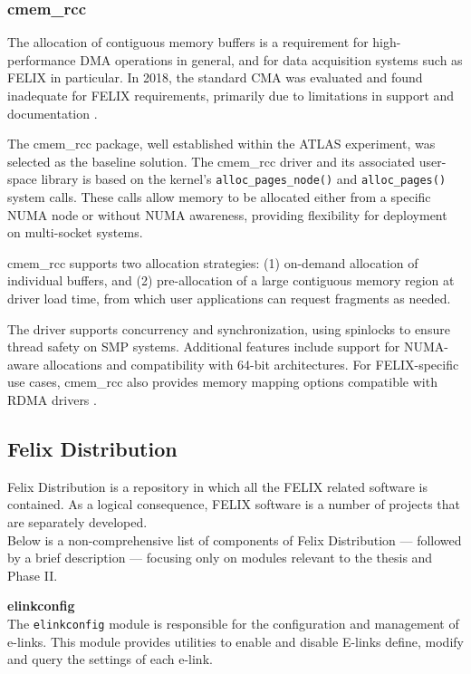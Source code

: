 \subsubsection{cmem\_rcc}

The allocation of contiguous memory buffers is a requirement for high-performance \acf{DMA} operations in general, and for data acquisition systems such as \acs{FELIX} in particular. In 2018, the standard \ac{CMA} was evaluated and found inadequate for \ac{FELIX} requirements, primarily due to limitations in support and documentation \cite{cmem-rcc}.

The cmem\_rcc \cite{cmem-rcc} package, well established within the \acs{ATLAS} experiment, was selected as the baseline solution. The cmem\_rcc driver and its associated user-space library is based on the kernel's \texttt{alloc\_pages\_node()} and \texttt{alloc\_pages()} system calls. These calls allow memory to be allocated either from a specific \ac{NUMA} node or without \ac{NUMA} awareness, providing flexibility for deployment on multi-socket systems.

cmem\_rcc supports two allocation strategies: (1) on-demand allocation of individual buffers, and (2) pre-allocation of a large contiguous memory region at driver load time, from which user applications can request fragments as needed.

The driver supports concurrency and synchronization, using spinlocks to ensure thread safety on \ac{SMP} systems. Additional features include support for \ac{NUMA}-aware allocations and compatibility with 64-bit architectures. For \ac{FELIX}-specific use cases, cmem\_rcc also provides memory mapping options compatible with \acs{RDMA} drivers \cite{cmem-rcc}.

\subsection{Felix Distribution}

Felix Distribution \cite{felix-distribution} is a repository in which all the \acs{FELIX} related software is contained.  As a logical consequence, \acs{FELIX} software is a number of projects that are separately developed.\\
Below is a non-comprehensive list of components of Felix Distribution --- followed by a brief description --- focusing only on modules relevant to the thesis and Phase II.

\textbf{elinkconfig}\\
The \texttt{elinkconfig} module is responsible for the configuration and management of e-links. This module provides utilities to enable and disable \acs{E-link}s define, modify and query the settings of each e-link.

